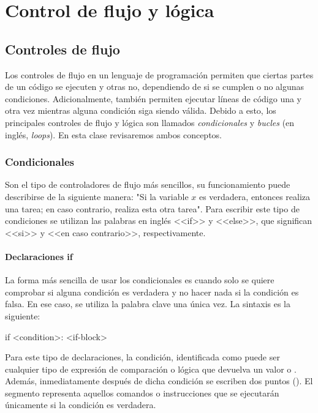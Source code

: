 \chapter{Control de flujo y lógica}

\setcounter{ipythcntr}{0}

\section{Controles de flujo}
Los controles de flujo en un lenguaje de programación permiten que ciertas partes de un código se ejecuten y otras no, dependiendo de si se cumplen o no algunas condiciones. Adicionalmente, también permiten ejecutar líneas de código una y otra vez mientras alguna condición siga siendo válida. Debido a esto, los principales controles de flujo y lógica son llamados \emph{condicionales} y \emph{bucles} (en inglés, \emph{loops}). En esta clase revisaremos ambos conceptos.

\subsection{Condicionales}
Son el tipo de controladores de flujo más sencillos, su funcionamiento puede describirse de la siguiente manera: "Si la variable $x$ es verdadera, entonces realiza una tarea; en caso contrario, realiza esta otra tarea". Para escribir este tipo de condiciones se utilizan las palabras en inglés <<if>> y <<else>>, que significan <<si>> y <<en caso contrario>>, respectivamente.  

\subsubsection{Declaraciones if}
La forma más sencilla de usar los condicionales es cuando solo se quiere comprobar si alguna condición es verdadera y no hacer nada si la condición es falsa. En ese caso, se utiliza la palabra clave  una única vez. La sintaxis es la siguiente:

\begin{shell}
if <condition>:
    <if-block>
\end{shell}

Para este tipo de declaraciones, la condición, identificada como  puede ser cualquier tipo de expresión de comparación o lógica que devuelva un valor  o . Además, inmediatamente después de dicha condición se escriben dos puntos (\pynorm{:}). El segmento  representa aquellos comandos o instrucciones que se ejecutarán únicamente si la condición es verdadera.

